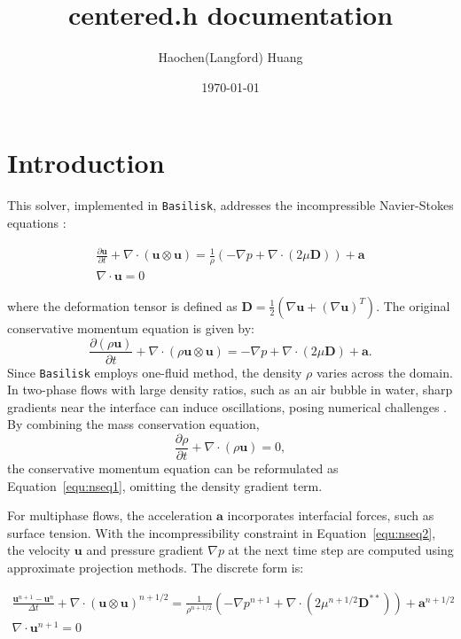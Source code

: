\documentclass[a4paper]{article}
\title{centered.h documentation}
\author{Haochen(Langford) Huang}
\date{\today}
\begin{document}
\maketitle
\section{Introduction}
This solver, implemented in \texttt{Basilisk}, addresses the incompressible Navier-Stokes equations \cite{2003_Popinet,2015_Popinet}:

\begin{gather}
    \frac{\partial \mathbf{u}}{\partial t} 
    + \nabla \cdot (\mathbf{u} \otimes \mathbf{u}) 
    = \frac{1}{\rho} \left(-\nabla p + \nabla \cdot (2\mu \mathbf{D})\right) 
    + \mathbf{a}
    \label{equ:nseq1} \\
    \nabla \cdot \mathbf{u} = 0 
    \label{equ:nseq2}
\end{gather}

where the deformation tensor is defined as 
$\mathbf{D} = \frac{1}{2} (\nabla \mathbf{u} + (\nabla \mathbf{u})^T)$. The original conservative momentum equation is given by:
\begin{equation}
    \frac{\partial (\rho \mathbf{u})}{\partial t} 
    + \nabla \cdot (\rho \mathbf{u} \otimes \mathbf{u}) 
    = -\nabla p + \nabla \cdot (2\mu \mathbf{D}) 
    + \mathbf{a}.
\end{equation}
Since \texttt{Basilisk} employs one-fluid method, the density $\rho$ varies across the domain. In two-phase flows with large density ratios, such as an air bubble in water, sharp gradients near the interface can induce oscillations, posing numerical challenges \cite{2021_Arrufat}. By combining the mass conservation equation,
\begin{equation}
    \frac{\partial \rho}{\partial t} 
    + \nabla \cdot (\rho \mathbf{u}) = 0,
\end{equation}
the conservative momentum equation can be reformulated as Equation~\ref{equ:nseq1}, omitting the density gradient term.

For multiphase flows, the acceleration $\mathbf{a}$ incorporates interfacial forces, such as surface tension. With the incompressibility constraint in Equation~\ref{equ:nseq2}, the velocity $\mathbf{u}$ and pressure gradient $\nabla p$ at the next time step are computed using approximate projection methods. The discrete form is:

\begin{gather}
    \frac{\mathbf{u}^{n+1} - \mathbf{u}^n}{\Delta t} 
    + \nabla \cdot (\mathbf{u} \otimes \mathbf{u})^{n+1/2} 
    = \frac{1}{\rho^{n+1/2}} \left(-\nabla p^{n+1} 
    + \nabla \cdot (2\mu^{n+1/2} \mathbf{D}^{**})\right) 
    + \mathbf{a}^{n+1/2}
    \label{equ:nseqdes1} \\
    \nabla \cdot \mathbf{u}^{n+1} = 0 
    \label{equ:nseqdes2}
\end{gather}
\end{document}
